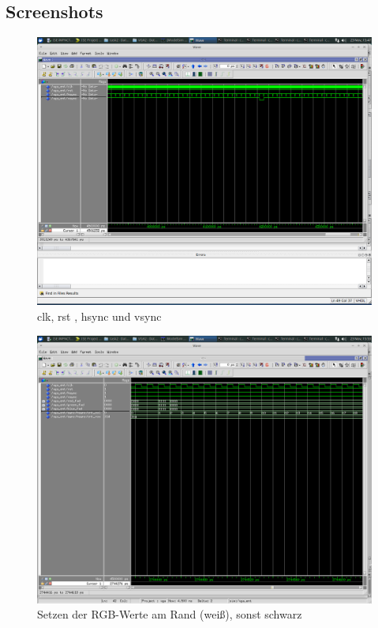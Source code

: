 \documentclass[parskip=full]{scrartcl}
\begin{document}
		\subsection{Screenshots}
			\begin{figure}[H]
				\includegraphics[scale=0.27]{Bilder/sync.png} 
				\caption*{clk, rst , hsync und vsync}
			\end{figure}
			\begin{figure}[H]
				\includegraphics[scale=0.27]{Bilder/edge_white_rest_black.png}
				\caption*{Setzen der RGB-Werte am Rand (weiß), sonst schwarz}
			\end{figure}
\end{document}
